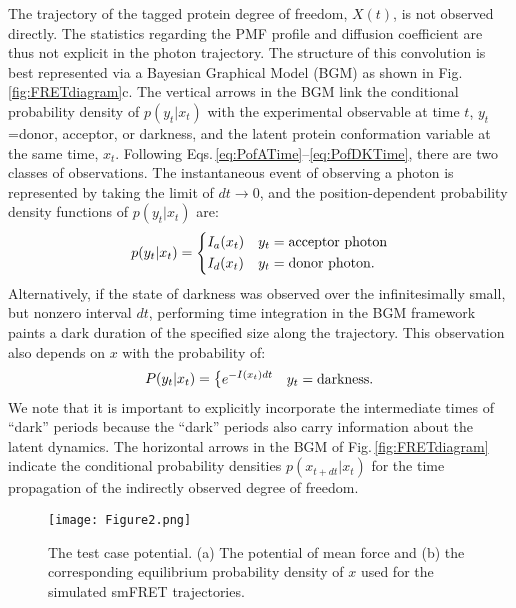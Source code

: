 \documentclass[journal=jpcbfk,manuscript=article,layout=twocolumn,articletitle=true]{achemso}
\begin{document}
The trajectory of the tagged protein degree of freedom, $X(t)$, is not observed directly. The statistics regarding the PMF profile and diffusion coefficient are thus not explicit in the photon trajectory. The structure of this convolution is best represented via a Bayesian Graphical Model (BGM) as shown in Fig.\,\ref{fig:FRETdiagram}c. The vertical arrows in the BGM link the conditional probability density of $p(y_t|x_t)$ with the experimental observable at time $t$, $y_t$=donor, acceptor, or darkness, and the latent protein conformation variable at the same time, $x_t$. Following Eqs.\,\ref{eq:PofATime}--\ref{eq:PofDKTime}, there are two classes of observations. The instantaneous event of observing a photon is represented by taking the limit of $dt \to 0$, and the position-dependent probability density functions of $p(y_t|x_t)$ are:
\begin{align}
\label{eq:BGMPhoton}
p(y_t|x_t) =
\begin{dcases}
I_a(x_t) & y_t = \text{acceptor photon} \\
I_d(x_t) & y_t = \text{donor photon}.
\end{dcases}
\end{align}
Alternatively, if the state of darkness was observed over the infinitesimally small, but nonzero interval $dt$, performing time integration in the BGM framework paints a dark duration of the specified size along the trajectory. This observation also depends on $x$ with the probability of:
\begin{align}
\label{eq:BGMDark}
P(y_t |x_t) = 
\begin{dcases}
e^{-I(x_t)dt}   & y_t = \text{darkness}.
\end{dcases}
\end{align}
We note that it is important to explicitly incorporate the intermediate times of ``dark'' periods because the ``dark'' periods also carry information about the latent dynamics. The horizontal arrows in the BGM of Fig.\,\ref{fig:FRETdiagram} indicate the conditional probability densities $p(x_{t+dt}|x_t)$ for the time propagation of the indirectly observed degree of freedom. 

\begin{figure}[t!]
\centering
\texttt{[image: Figure2.png]} 
\caption[Test case potential]{\label{fig:VrefFRET} The test case potential. (a) The potential of mean force and (b) the corresponding equilibrium probability density of $x$ used for the simulated smFRET trajectories.}
\end{figure} 
\end{document}
